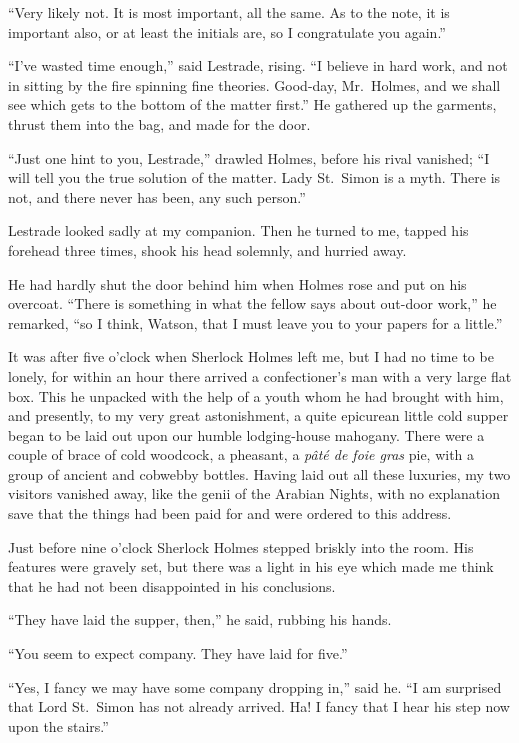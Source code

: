 “Very likely not. It is most important, all the same. As
to the note, it is important also, or at least the initials are, so
I congratulate you again.”

“I’ve wasted time enough,” said Lestrade, rising. “I believe
in hard work, and not in sitting by the fire spinning fine
theories. Good-day, Mr.~Holmes, and we shall see which
gets to the bottom of the matter first.” He gathered up the
garments, thrust them into the bag, and made for the door.

“Just one hint to you, Lestrade,” drawled Holmes, before
his rival vanished; “I will tell you the true solution of the
matter. Lady St.~Simon is a myth. There is not, and there
never has been, any such person.”

Lestrade looked sadly at my companion. Then he turned
to me, tapped his forehead three times, shook his head solemnly,
and hurried away.

He had hardly shut the door behind him when Holmes rose
and put on his overcoat. “There is something in what the
fellow says about out-door work,” he remarked, “so I think,
Watson, that I must leave you to your papers for a little.”

It was after five o’clock when Sherlock Holmes left me, but
I had no time to be lonely, for within an hour there arrived
a confectioner’s man with a very large flat box. This he unpacked
with the help of a youth whom he had brought with
him, and presently, to my very great astonishment, a quite
epicurean little cold supper began to be laid out upon our
humble lodging-house mahogany. There were a couple of
brace of cold woodcock, a pheasant, a \textit{pâté de foie gras} pie,
with a group of ancient and cobwebby bottles. Having laid
out all these luxuries, my two visitors vanished away, like the
genii of the Arabian Nights, with no explanation save that
the things had been paid for and were ordered to this address.

Just before nine o’clock Sherlock Holmes stepp\-ed briskly
into the room. His features were gravely set, but there was a
light in his eye which made me think that he had not been
disappointed in his conclusions.

“They have laid the supper, then,” he said, rubbing his
hands.

“You seem to expect company. They have laid for five.”

“Yes, I fancy we may have some company dropping in,”
said he. “I am surprised that Lord St.~Simon has not already
arrived. Ha! I fancy that I hear his step now upon
the stairs.”


